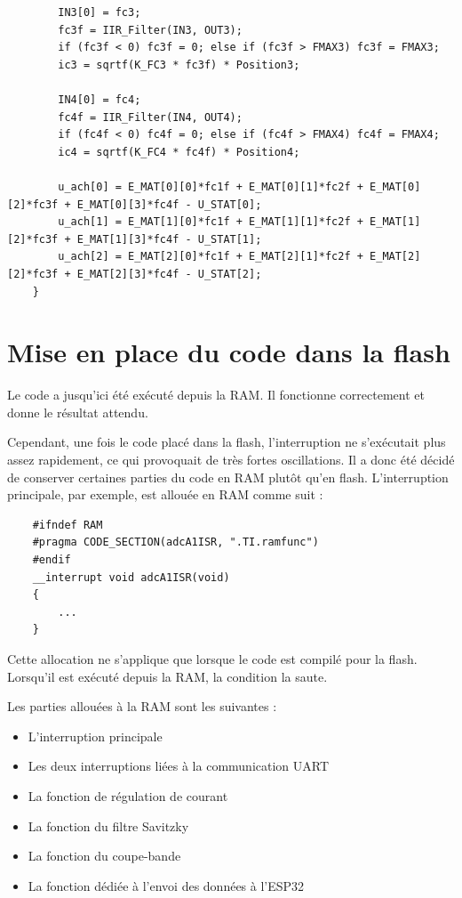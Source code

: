 \begin{verbatim}
        IN3[0] = fc3;
        fc3f = IIR_Filter(IN3, OUT3);
        if (fc3f < 0) fc3f = 0; else if (fc3f > FMAX3) fc3f = FMAX3;
        ic3 = sqrtf(K_FC3 * fc3f) * Position3;

        IN4[0] = fc4;
        fc4f = IIR_Filter(IN4, OUT4);
        if (fc4f < 0) fc4f = 0; else if (fc4f > FMAX4) fc4f = FMAX4;
        ic4 = sqrtf(K_FC4 * fc4f) * Position4;

        u_ach[0] = E_MAT[0][0]*fc1f + E_MAT[0][1]*fc2f + E_MAT[0][2]*fc3f + E_MAT[0][3]*fc4f - U_STAT[0];
        u_ach[1] = E_MAT[1][0]*fc1f + E_MAT[1][1]*fc2f + E_MAT[1][2]*fc3f + E_MAT[1][3]*fc4f - U_STAT[1];
        u_ach[2] = E_MAT[2][0]*fc1f + E_MAT[2][1]*fc2f + E_MAT[2][2]*fc3f + E_MAT[2][3]*fc4f - U_STAT[2];
    }
\end{verbatim}

\section{Mise en place du code dans la flash}
Le code a jusqu'ici été exécuté depuis la RAM. Il fonctionne correctement et donne le résultat attendu.

Cependant, une fois le code placé dans la flash, l'interruption ne s'exécutait plus assez rapidement, ce qui provoquait de très fortes oscillations. Il a donc été décidé de conserver certaines parties du code en RAM plutôt qu'en flash. L'interruption principale, par exemple, est allouée en RAM comme suit :

\begin{verbatim}
    #ifndef RAM
    #pragma CODE_SECTION(adcA1ISR, ".TI.ramfunc")
    #endif
    __interrupt void adcA1ISR(void)
    {
        ...
    }
\end{verbatim}

Cette allocation ne s'applique que lorsque le code est compilé pour la flash. Lorsqu'il est exécuté depuis la RAM, la condition la saute.

Les parties allouées à la RAM sont les suivantes :

\begin{itemize}
    \item L'interruption principale
    \item Les deux interruptions liées à la communication UART
    \item La fonction de régulation de courant
    \item La fonction du filtre Savitzky
    \item La fonction du coupe-bande
    \item La fonction dédiée à l'envoi des données à l'ESP32
\end{itemize}

